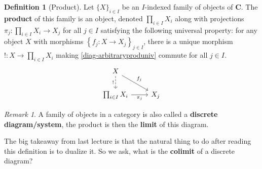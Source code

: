 \documentclass{article}
\theoremstyle{definition}
\newtheorem{defn}[thm]{Definition}
\theoremstyle{remark}
\newtheorem{rem}[thm]{Remark}
\begin{document}
\begin{defn}[Product]
    Let $\{X\}_{i \in I}$ be an $I$-indexed family of objects of $\mathbf{C}$. The \textbf{product} of this family is an object, denoted $\prod_{i \in I} X_i$ along with projections $\pi_j: \prod_{i \in I} X_i \rightarrow X_j$ for all $j \in I$ satisfying the following universal property: for any object $X$ with morphisms $\left\{ f_j: X\rightarrow X_j\right\}_{j \in I}$, there is a unique morphism $!: X \rightarrow \prod_{i \in I} X_i$ making \eqref{diag-arbitraryproduniv} commute for all $j \in I$.
    \begin{equation}\label{diag-arbitraryproduniv}
        \begin{tikzcd}
        X \arrow[d, "!"', dashed] \arrow[rd, "f_j"] &     \\
        \prod_{i \in I}X_i \arrow[r, "\pi_j"']     & X_j
        \end{tikzcd}
    \end{equation}
\end{defn}
\begin{rem}
    A family of objects in a category is also called a \textbf{discrete diagram/system}, the product is then the \textbf{limit} of this diagram.
\end{rem}
The big takeaway from last lecture is that the natural thing to do after reading this definition is to dualize it. So we ask, what is the \textbf{colimit} of a discrete diagram?
\end{document}
